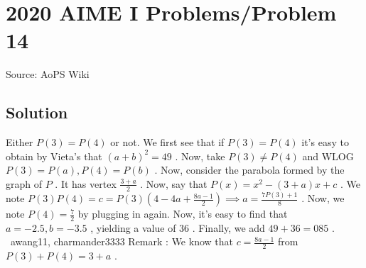 \documentclass[12pt]{article}
\begin{document}
\section*{{2020 AIME I Problems/Problem 14}}
Source: AoPS Wiki

\subsection*{Solution}
Either $P(3) = P(4)$ or not. We first see that if $P(3) = P(4)$ it's easy to obtain by Vieta's that $(a+b)^2 = 49$ . Now, take $P(3) \neq P(4)$ and WLOG $P(3) = P(a), P(4) = P(b)$ . Now, consider the parabola formed by the graph of $P$ . It has vertex $\frac{3+a}{2}$ . Now, say that $P(x) = x^2 - (3+a)x + c$ . We note $P(3)P(4) = c = P(3)\left(4 - 4a + \frac{8a - 1}{2}\right) \implies a = \frac{7P(3) + 1}{8}$ . Now, we note $P(4) = \frac{7}{2}$ by plugging in again. Now, it's easy to find that $a = -2.5, b = -3.5$ , yielding a value of $36$ . Finally, we add $49 + 36 = \boxed{085}$ . ~awang11, charmander3333 Remark : We know that $c=\frac{8a-1}{2}$ from $P(3)+P(4)=3+a$ .
\end{document}
